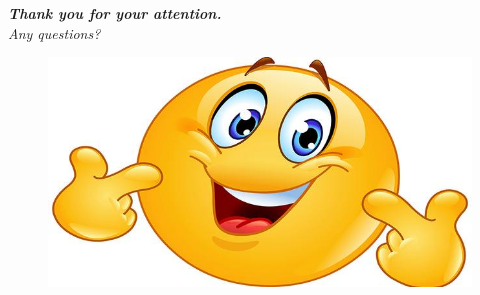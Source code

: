 \begin{frame}
  \centering \Large
  \emph{
    \textbf{Thank you for your attention.}\\
    Any questions?
    }
    \vspace{0.4cm}
     \begin{figure}
        \includegraphics[scale=0.1]{figures/smile.jpg}
	\end{figure}
\end{frame}